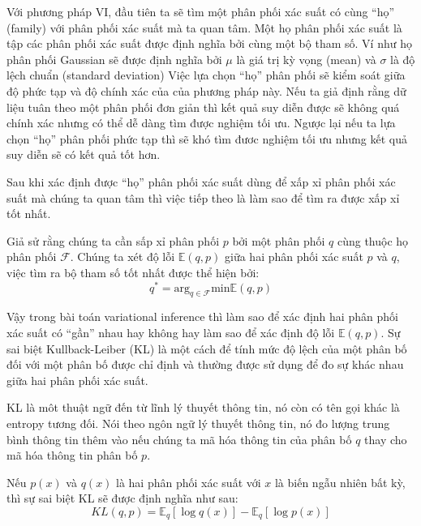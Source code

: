         Với phương pháp VI, đầu tiên ta sẽ tìm một phân phối xác suất có cùng ``họ'' (family) với phân phối xác suất mà ta quan tâm. 
        Một họ phân phối xác suất là tập các phân phối xác suất được định nghĩa bởi cùng một bộ tham số. 
        Ví như họ phân phối Gaussian sẽ được định nghĩa bởi $\mu$ là giá trị kỳ vọng (mean) và $\sigma$ là độ lệch chuẩn (standard deviation)
        Việc lựa chọn ``họ'' phân phối sẽ kiểm soát giữa độ phức tạp và độ chính xác của của phương pháp này. 
        Nếu ta giả định rằng dữ liệu tuân theo một phân phối đơn giản thì kết quả suy diễn được sẽ không quá chính xác nhưng có thể dễ dàng tìm được nghiệm tối ưu. Ngược lại nếu ta lựa chọn ``họ'' phân phối phức tạp thì sẽ khó tìm đươc nghiệm tối ưu nhưng kết quả suy diễn sẽ có kết quả tốt hơn. 

        Sau khi xác định được ``họ'' phân phối xác suất dùng để xấp xỉ phân phối xác suất mà chúng ta quan tâm thì việc tiếp theo là làm sao để tìm ra được xấp xỉ tốt nhất. 
        
        Giả sử rằng chúng ta cần sấp xỉ phân phối $p$ bởi một phân phối $q$ cùng thuộc họ phân phối $\mathcal{F}$.
        Chúng ta xét độ lỗi $\mathbb{E}(q,p)$ giữa hai phân phối xác suất $p$ và $q$, việc tìm ra bộ tham số tốt nhất được thể hiện bởi:
        \begin{equation}
        \label{equal_minErrorpq)}
            q^* = \text{arg}_{q\in\mathcal{F}} \text{min}\mathbb{E}(q,p)    
        \end{equation}
        

        Vậy trong bài toán variational inference thì làm sao để xác định hai phân phối xác suất có ``gần'' nhau hay không hay làm sao để xác định độ lỗi $\mathbb{E}(q,p)$. 
        Sự sai biệt Kullback-Leiber (KL) là một cách để tính mức độ lệch của một phân bố đối với một phân bố được chỉ định và thường được sử dụng để đo sự khác nhau giữa hai phân phối xác suất. 

        KL là môt thuật ngữ đến từ lĩnh lý thuyết thông tin, nó còn có tên gọi khác là entropy tương đối. Nói theo ngôn ngữ lý thuyết thông tin, nó đo lượng trung bình thông tin thêm vào nếu chúng ta mã hóa thông tin của phân bố $q$  thay cho mã hóa thông tin phân bố $p$.

        Nếu $p(x)$ và $q(x)$ là hai phân phối xác suất với $x$ là biến ngẫu nhiên bất kỳ, thì sự sai biệt KL sẽ được định nghĩa như sau:
        \begin{equation}
        \label{KLD}
            KL(q,p) = \mathbb{E}_q[\log q(x)] - \mathbb{E}_q[\log p(x)]    
        \end{equation}
        

